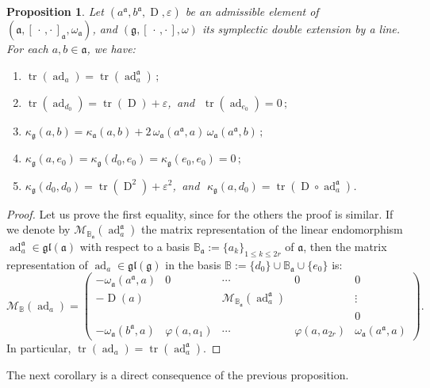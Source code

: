 \documentclass[final,1p,times,nopreprintline]{elsarticle}
\newtheorem{proposition}{Proposition}[section]
\theoremstyle{definition}
\numberwithin{equation}{section}
\newcommand{\ro}{\circ}
\newcommand{\w}{\omega}
\newcommand{\tr}{\operatorname{tr}}
\newcommand{\g}{\mathfrak{g}}
\newcommand{\ai}{\mathfrak{a}}
\newcommand{\ad}{\operatorname{ad}}
\numberwithin{equation}{section}
\newcommand{\D}{\operatorname{D}}
\newcommand{\gl}{\mathfrak{gl}}
\newcommand{\cro}{[\,\cdot\,,\cdot\,]}
\begin{document}
\begin{proposition}\label{KillingOfAdim1}
Let $(a^\ai,b^\ai,\D,\varepsilon)$ be an admissible element of $(\ai,\cro_\ai,\w_\ai)$, and $(\g,[\,\cdot\,,\cdot\,],\w)$ its symplectic double extension by a line. For each $a,b\in\ai$, we have:\vspace{1mm}
	\begin{enumerate}
		\item[$1.$] $\tr(\ad_a)=\tr(\ad^\ai_a)\,;$\vspace{2mm}
		\item[$2.$] $\tr(\ad_{d_0})=\tr(\D)+\varepsilon$,\, and  $\,\,\tr(\ad_{e_0})=0\,;$\vspace{2mm}
		\item[$3.$] $\kappa_\g(a,b)=\kappa_\ai(a,b)+2\,\w_\ai(a^\ai,a)\,\w_\ai(a^\ai,b)\,;$\vspace{2mm}
		\item[$4.$] $\kappa_\g(a,e_0)=\kappa_\g(d_0,e_0)=\kappa_\g(e_0,e_0)=0\,;$\vspace{2mm}
		\item[$5.$] $\kappa_\g(d_0,d_0)=\tr(\D^2)+\varepsilon^2$,\, and $\,\,\kappa_\g(a,d_0)=\tr(\D\ro\ad^\ai_a)$.
	\end{enumerate}
\end{proposition}

\begin{proof}
	Let us prove the first equality, since for the others the proof is similar. If we denote by $\mathcal{M}_{\mathbb{B}_\ai}(\ad^\ai_a)$ the matrix representation of the linear endomorphism $\ad^\ai_a\in\gl(\ai)$ with respect to a basis $\mathbb{B}_\ai:=\{a_k\}_{1\leqslant k\leqslant 2r}$ of $\ai$, then the matrix representation of $\ad_a\in\gl(\g)$ in the basis $\mathbb{B}:=\{d_0\}\cup\mathbb{B}_\ai\cup\{e_0\}$ is:
	\begin{equation*}
		\mathcal{M}_\mathbb{B}(\ad_a)=\begin{pmatrix}
			-\w_\ai(a^\ai,a) & 0 & \cdots & 0 & 0\\
			-\D(a)& 	&\mathcal{M}_{\mathbb{B}_\ai}(\ad^\ai_a) &&\vdots\\
			& 	&&&0\\
			-\w_\ai(b^\ai,a) & \varphi(a,a_1) 	&\cdots&\varphi(a,a_{2r})&\w_\ai(a^\ai,a)
		\end{pmatrix}.
	\end{equation*}
	In particular, $\tr(\ad_a)=\tr(\ad^\ai_a)$.
\end{proof}

The next corollary is a direct consequence of the previous proposition.
\end{document}

